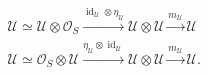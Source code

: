 \(
\begin{gathered}
\mathcal U\simeq\mathcal U\otimes\mathcal O_S
\xrightarrow{\operatorname{id}_{\mathcal U}\otimes\eta_{\mathcal U}}
\mathcal U\otimes\mathcal U
\xrightarrow{m_{\mathcal U}}
\mathcal U
\\[0.7em]
\mathcal U\simeq\mathcal O_S\otimes\mathcal U
\xrightarrow{\eta_{\mathcal U}\otimes\operatorname{id}_{\mathcal U}}
\mathcal U\otimes\mathcal U
\xrightarrow{m_{\mathcal U}}
\mathcal U.
\end{gathered}
\)
